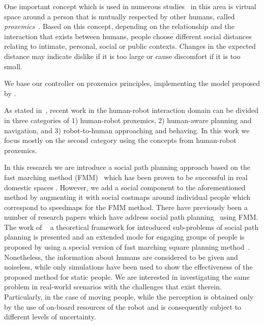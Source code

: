 One important concept which is used in numerous studies~\cite{Mumm2011,Takayama2009,Walters2011,ferrer2013robot} in this area is virtual space around a person that is mutually respected by other humans, called \textit{proxemics}~\cite{Hall1969}.
Based on this concept, depending on the relationship and the interaction that exists between humans, people choose different social distances relating to intimate, personal, social or public contexts.
Changes in the expected distance may indicate dislike if it is too large or cause discomfort if it is too small.



We base our controller on proxemics principles, implementing the model proposed by \cite{kirby2009companion}.

As stated in~\cite{gomez2013social}, recent work in the human-robot interaction domain can be divided in three categories of 1) human-robot proxemics, 2) human-aware planning and navigation, and 3) robot-to-human approaching and behaving. In this work we focus mostly on the second category using the concepts from human-robot proxemics. %

In this research we are introduce a social path planning approach based on the fast marching method (FMM)~\cite{sethian1999fast} which has been proven to be successful in real domestic spaces \cite{ventura2015}. However, we add a social component to the aforementioned method by augmenting it with social costmaps around individual people which correspond to speedmaps for the FMM method. There have previously been a number of research papers which have address social path planning~\cite{gomez2014fast,gomez2013social} using FMM. The work of ~\cite{gomez2014fast} a theoretical framework for introduced sub-problems of social path planning is presented and an extended mode for engaging groups of people is proposed by using a special version of fast marching square planning method~\cite{valero2013fast}. Nonetheless, the information about humans are considered to be given and noiseless, while only simulations have been used to show the effectiveness of the proposed method for static people. We are interested in investigating the same problem in real-world scenarios with the challenges that exist therein. Particularly, in the case of moving people, while the perception is obtained only by the use of on-board resources of the robot and is consequently subject to different levels of uncertainty.

